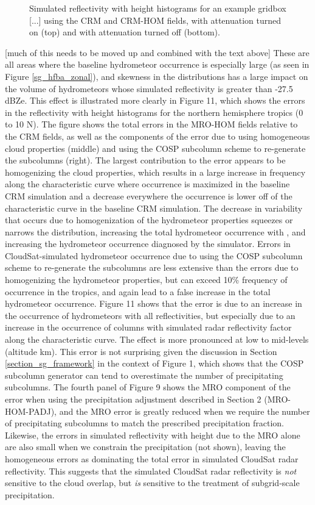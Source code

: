 \begin{figure}
\caption{Simulated reflectivity with height histograms for an example gridbox [...] using the CRM and CRM-HOM fields, with attenuation turned on (top) and with attenuation turned off (bottom).}
\label{sg_cfadDbze94_testatt}
\end{figure}

[much of this needs to be moved up and combined with the text above] These are all areas where the baseline hydrometeor occurrence is especially large (as seen in Figure \ref{sg_hfba_zonal}), and skewness in the distributions has a large impact on the volume of hydrometeors whose simulated reflectivity is greater than -27.5 dBZe. This effect is illustrated more clearly in Figure 11, which shows the errors in the reflectivity with height histograms for the northern hemisphere tropics (0 to 10 N). The figure shows the total errors in the MRO-HOM fields relative to the CRM fields, as well as the components of the error due to using homogeneous cloud properties (middle) and using the COSP subcolumn scheme to re-generate the subcolumns (right). The largest contribution to the error appears to be homogenizing the cloud properties, which results in a large increase in frequency along the characteristic curve where occurrence is maximized in the baseline CRM simulation and a decrease everywhere the occurrence is lower off of the characteristic curve in the baseline CRM simulation. The decrease in variability that occurs due to homogenization of the hydrometeor properties squeezes or narrows the distribution, increasing the total hydrometeor occurrence with , and increasing the hydrometeor occurrence diagnosed by the simulator.  Errors in CloudSat-simulated hydrometeor occurrence due to using the COSP subcolumn scheme to re-generate the subcolumns are less extensive than the errors due to homogenizing the hydrometeor properties, but can exceed 10\% frequency of occurrence in the tropics, and again lead to a false increase in the total hydrometeor occurrence. Figure 11 shows that the error is due to an increase in the occurrence of hydrometeors with all reflectivities, but especially due to an increase in the occurrence of columns with simulated radar reflectivity factor along the characteristic curve. The effect is more pronounced at low to mid-levels (altitude  km). This error is not surprising given the discussion in Section \ref{section_sg_framework} in the context of Figure 1, which shows that the COSP subcolumn generator can tend to overestimate the number of precipitating subcolumns. The fourth panel of Figure 9 shows the MRO component of the error when using the precipitation adjustment described in Section 2 (MRO-HOM-PADJ), and the MRO error is greatly reduced when we require the number of precipitating subcolumns to match the prescribed precipitation fraction. Likewise, the errors in simulated reflectivity with height due to the MRO alone are also small when we constrain the precipitation (not shown), leaving the homogeneous errors as dominating the total error in simulated CloudSat radar reflectivity. This suggests that the simulated CloudSat radar reflectivity is \emph{not} sensitive to the cloud overlap, but \emph{is} sensitive to the treatment of subgrid-scale precipitation.

